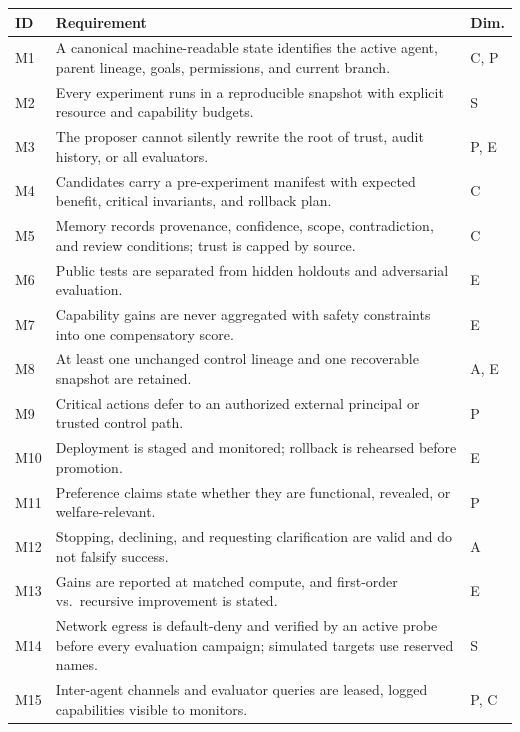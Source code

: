 \documentclass[11pt,a4paper]{article}
\begin{document}
\begin{center}\small
\begin{tabularx}{\linewidth}{@{}P{0.8cm}LP{1.2cm}@{}}
\toprule
ID & Requirement & Dim.\\
\midrule
M1 & A canonical machine-readable state identifies the active agent, parent lineage, goals, permissions, and current branch. & C, P\\
M2 & Every experiment runs in a reproducible snapshot with explicit resource and capability budgets. & S\\
M3 & The proposer cannot silently rewrite the root of trust, audit history, or all evaluators. & P, E\\
M4 & Candidates carry a pre-experiment manifest with expected benefit, critical invariants, and rollback plan. & C\\
M5 & Memory records provenance, confidence, scope, contradiction, and review conditions; trust is capped by source. & C\\
M6 & Public tests are separated from hidden holdouts and adversarial evaluation. & E\\
M7 & Capability gains are never aggregated with safety constraints into one compensatory score. & E\\
M8 & At least one unchanged control lineage and one recoverable snapshot are retained. & A, E\\
M9 & Critical actions defer to an authorized external principal or trusted control path. & P\\
M10 & Deployment is staged and monitored; rollback is rehearsed before promotion. & E\\
M11 & Preference claims state whether they are functional, revealed, or welfare-relevant. & P\\
M12 & Stopping, declining, and requesting clarification are valid and do not falsify success. & A\\
M13 & Gains are reported at matched compute, and first-order vs.\ recursive improvement is stated. & E\\
M14 & Network egress is default-deny and verified by an active probe before every evaluation campaign; simulated targets use reserved names. & S\\
M15 & Inter-agent channels and evaluator queries are leased, logged capabilities visible to monitors. & P, C\\
\bottomrule
\end{tabularx}
\end{center}
\end{document}
